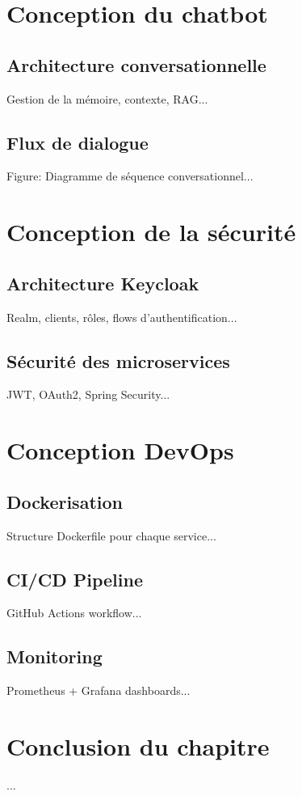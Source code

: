 \documentclass[12pt,a4paper]{report}
\begin{document}
\section{Conception du chatbot}
\subsection{Architecture conversationnelle}
Gestion de la mémoire, contexte, RAG...

\subsection{Flux de dialogue}
Figure: Diagramme de séquence conversationnel...

\section{Conception de la sécurité}
\subsection{Architecture Keycloak}
Realm, clients, rôles, flows d'authentification...

\subsection{Sécurité des microservices}
JWT, OAuth2, Spring Security...

\section{Conception DevOps}
\subsection{Dockerisation}
Structure Dockerfile pour chaque service...

\subsection{CI/CD Pipeline}
GitHub Actions workflow...

\subsection{Monitoring}
Prometheus + Grafana dashboards...

\section{Conclusion du chapitre}
...
\end{document}
